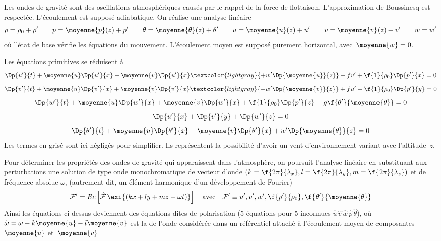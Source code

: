 
\sk
Les ondes de gravité sont des oscillations atmosphériques
causés par le rappel de la force de flottaison.
L'approximation de Boussinesq est respectée.
L'écoulement est supposé adiabatique.
On réalise une analyse linéaire
\[
\rho =\rho_0 + \rho' 
\qquad
p = \moyenne{p}(z) + p' 
\qquad
\theta = \moyenne{\theta}(z) + \theta'
\qquad
u = \moyenne{u}(z) + u'
\qquad
v = \moyenne{v}(z) + v'
\qquad
w = w'
\]
\noindent où l'état de base vérifie les équations du mouvement.
L'écoulement moyen est supposé purement horizontal, avec~$\moyenne{w}=0$.

\sk
Les équations primitives se réduisent à
\[ 
\Dp{u'}{t} 
+ \moyenne{u} \Dp{u'}{x} 
+ \moyenne{v} \Dp{u'}{x} 
\textcolor{lightgray}{+ w' \Dp{\moyenne{u}}{z}}
- f v' 
+ \f{1}{\rho_0} \Dp{p'}{x}
= 0
\]
\[ 
\Dp{v'}{t} 
+ \moyenne{u} \Dp{v'}{x} 
+ \moyenne{v} \Dp{v'}{x} 
\textcolor{lightgray}{+ w' \Dp{\moyenne{v}}{z}}
+ f u' 
+ \f{1}{\rho_0} \Dp{p'}{y}
= 0
\]
\[ 
\Dp{w'}{t} 
+ \moyenne{u} \Dp{w'}{x} 
+ \moyenne{v} \Dp{w'}{x} 
+ \f{1}{\rho_0} \Dp{p'}{z}
- g \f{\theta'}{\moyenne{\theta}}
= 0
\]
\[ 
\Dp{u'}{x} 
+ \Dp{v'}{y}
+ \Dp{w'}{z}
= 0
\]
\[ 
\Dp{\theta'}{t} 
+ \moyenne{u} \Dp{\theta'}{x} 
+ \moyenne{v} \Dp{\theta'}{x} 
+ w' \Dp{\moyenne{\theta}}{z}
= 0
\]
\noindent Les termes en grisé sont ici négligés pour simplifier. 
Ils représentent la possibilité d'avoir un vent d'environnement
variant avec l'altitude~$z$.


\sk
Pour déterminer les propriétés des ondes de gravité 
qui apparaissent dans l'atmosphère,
on poursuit l'analyse linéaire en substituant
aux perturbations une solution
de type onde monochromatique 
de vecteur d'onde 
$(k=\f{2\pi}{\lambda_x},l=\f{2\pi}{\lambda_y},m=\f{2\pi}{\lambda_z})$ 
et de fréquence absolue $\omega$, 
(autrement dit, un élément harmonique d'un développement de Fourier)
\[
\mathcal{F}'
= 
Re \left[ 
\hat{\mathcal{F}} \, \exi{(kx+ly+mz-\omega t)} 
\right]
\quad \textrm{avec} \quad 
\mathcal{F}' \equiv u', v', w', \f{p'}{\rho_0}, \f{\theta'}{\moyenne{\theta}}
\]
\noindent Ainsi les équations ci-dessus deviennent 
des équations dites de polarisation 
(5 équations pour 5 inconnues $\hat{u} \, \hat{v} \, \hat{w} \, \hat{p} \, \hat{\theta}$), 
où~$\tilde{\omega} = \omega - k \moyenne{u} - l \moyenne{v}$
est la  de l'onde considérée
dans un référentiel attaché à l'écoulement moyen
de composantes $\moyenne{u}$ et~$\moyenne{v}$

